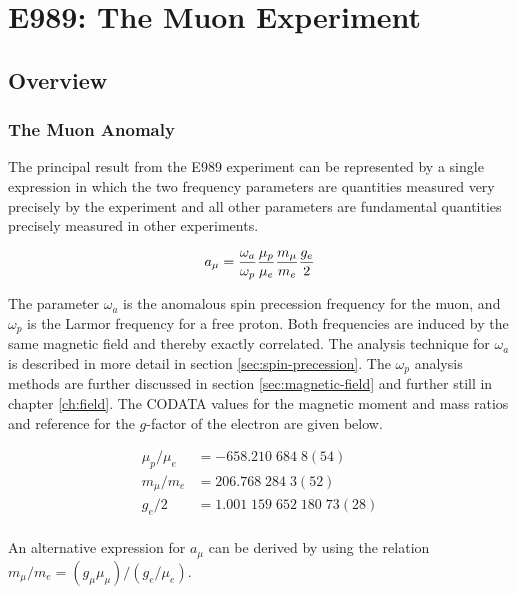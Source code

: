 \chapter {E989: The Muon \gmtwo Experiment} \label{ch:expt}

\section{Overview} \label{sec:expt-overview}

\subsection{The Muon Anomaly}

The principal result from the E989 experiment can be represented by a single expression in which the two frequency parameters are quantities measured very precisely by the \mugmtwo experiment and all other parameters are fundamental quantities precisely measured in other experiments.

\begin{equation}
\label{eqn:g-2-result-1}
a_\mu = \frac{\omega_a}{\omega_p} \frac{\mu_p}{\mu_e} \\
\frac{m_\mu}{m_e} \frac{g_e}{2}
\end{equation}

\noindent
The parameter $\omega_a$ is the anomalous spin precession frequency for the muon, and $\omega_p$ is the Larmor frequency for a free proton.  Both frequencies are induced by the same magnetic field and thereby exactly correlated. The analysis technique for $\omega_a$ is described in more detail in section \ref{sec:spin-precession}.  The $\omega_p$ analysis methods are further discussed in section \ref{sec:magnetic-field} and further still in chapter \ref{ch:field}.  The CODATA values \cite{codata} for the magnetic moment and mass ratios and reference \cite{g-e-measurement} for the $g$-factor of the electron are given below.

\begin{align}
\mu_p/\mu_e & = -658.210\;684\;8(54) \\
m_\mu/m_e & = 206.768\;284\;3(52) \\
g_e/2 & = 1.001\;159\;652\;180\;73(28) \\
\end{align}

An alternative expression for $a_\mu$ can be derived by using the relation $m_\mu / m_e = (g_\mu \mu_\mu) / (g_e / \mu_e)$.  

